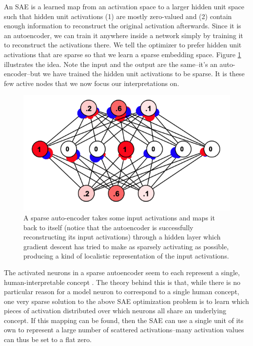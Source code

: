An SAE is a learned map from an activation space to a larger hidden unit space
such that hidden unit activations (1) are mostly zero-valued and (2) contain
enough information to reconstruct the original activation afterwards. Since it
is an autoencoder, we can train it anywhere inside a network simply by training
it to reconstruct the activations there. We tell the optimizer to prefer hidden
unit activations that are sparse so that we learn a sparse embedding space.
Figure \ref{saeSimbrain} illustrates the idea. Note the input and the output
are the same--it's an auto-encoder--but we have trained the hidden unit
activations to be sparse. It is these few active nodes that we now focus our
interpretations on.

\begin{figure}[ht]
\centering
\includegraphics[scale=.5]{./images/saeSimbrain.png}
\caption[Simbrain screenshot from Jeff Yoshimi.]{ A sparse auto-encoder takes
      some input activations and maps it back to itself (notice that the
      autoencoder is successfully reconstructing its input activations)
      through a hidden layer which gradient descent has tried to make
      as sparsely activating as possible, producing a kind of localistic representation of
      the input activations. }
\label{saeSimbrain}
\end{figure}

The activated neurons in a sparse autoencoder seem to each represent a single,
human-interpretable concept \cite{cunningham2023sparse,
bricken2023monosemanticity}. The theory behind this is that, while there is no
particular reason for a model neuron to correspond to a single human concept,
one very sparse solution to the above SAE optimization problem is to learn
which pieces of activation distributed over which neurons all share an
underlying concept. If this mapping can be found, then the SAE can use a single
unit of its own to represent a large number of scattered activations--many
activation values can thus be set to a flat zero.

